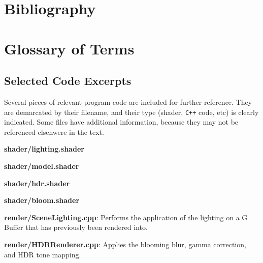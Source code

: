 \documentclass[11pt, oneside]{report}
\begin{document}
\begingroup	
	\setlength\bibitemsep{18pt}
	
	\chapter{Bibliography}
	\printbibliography[heading=none]
\endgroup


\begingroup
	\renewcommand{\glossarysection}[2][]{}
	
	\chapter{Glossary of Terms}
	\printglossaries
\endgroup


\begin{appendices}
	\makeatletter
	\makeatother
	
	\chapter{Selected Code Excerpts}
Several pieces of relevant program code are included for further reference. They are demarcated by their filename, and their type (shader, \texttt{C++} code, etc) is clearly indicated. Some files have additional information, because they may not be referenced elsehwere in the text.

	\textbf{shader/lighting.shader}
	
	
	\textbf{shader/model.shader}
	
	
	\textbf{shader/hdr.shader}
	
	
	\textbf{shader/bloom.shader}
	
	
	\textbf{render/SceneLighting.cpp}:
	Performs the application of the lighting on a \gls{G Buffer} that has previously been rendered into.
	
	
	
	\newpage
	\textbf{render/HDRRenderer.cpp}:
	Applies the blooming blur, gamma correction, and \gls{HDR} \gls{tone mapping}.
	
	

	\end{appendices}
\end{document}
